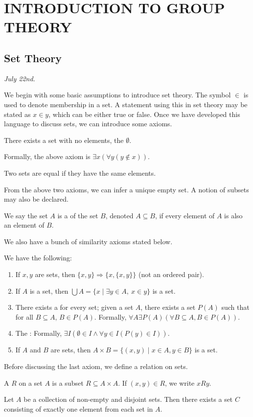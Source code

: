 \chapter{INTRODUCTION TO GROUP THEORY}

\section{Set Theory}
\textit{July 22nd.}

We begin with some basic assumptions to introduce set theory. The symbol $\in$ is used to denote membership in a set. A statement using this in set theory may be stated as $x \in y$, which can be either true or false. Once we have developed this language to discuss sets, we can introduce some axioms.
\begin{axiom}
    There exists a set with no elements, the  $\emptyset$.
\end{axiom}
Formally, the above axiom is $\exists x (\forall y (y \notin x))$.
\begin{axiom}
    Two sets are equal if they have the same elements.
\end{axiom}
From the above two axioms, we can infer a unique empty set. A notion of subsets may also be declared.
\begin{definition}
    We say the set $A$ is a  of the set $B$, denoted $A \subseteq B$, if every element of $A$ is also an element of $B$.
\end{definition}
We also have a bunch of similarity axioms stated below.
\begin{axiom}
    We have the following:
    \begin{enumerate}
        \item If $x, y$ are sets, then $\{x, y\} \Rightarrow \{x, \{x, y\}\}$ (not an ordered pair).
        \item If $A$ is a set, then $\bigcup A = \{x \mid \exists y \in A,\ x \in y\}$ is a set.
        \item There exists a  for every set; given a set $A$, there exists a set $P(A)$ such that for all $B \subseteq A$, $B \in P(A)$. Formally, $\forall A \exists P(A) (\forall B \subseteq A, B \in P(A))$.
        \item The : Formally, $\exists I (\emptyset \in I \wedge \forall y \in I (P(y) \in I))$.
        \item If $A$ and $B$ are sets, then $A \times B = \{(x,y) \mid x \in A, y \in B\}$ is a set.
    \end{enumerate}
\end{axiom}
Before discussing the last axiom, we define a relation on sets.
\begin{definition}
    A  $R$ on a set $A$ is a subset $R \subseteq A \times A$. If $(x,y) \in R$, we write $xRy$.
\end{definition}
\begin{axiom}
    Let $A$ be a collection of non-empty and disjoint sets. Then there exists a set $C$ consisting of exactly one element from each set in $A$.
\end{axiom}


